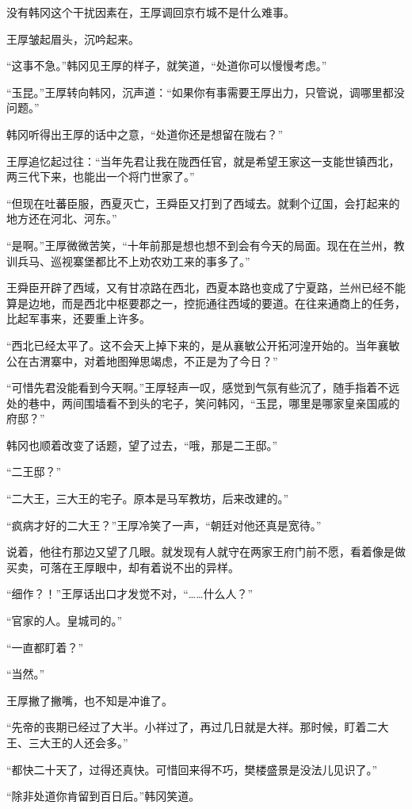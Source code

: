 没有韩冈这个干扰因素在，王厚调回京冇城不是什么难事。

王厚皱起眉头，沉吟起来。

“这事不急。”韩冈见王厚的样子，就笑道，“处道你可以慢慢考虑。”

“玉昆。”王厚转向韩冈，沉声道：“如果你有事需要王厚出力，只管说，调哪里都没问题。”

韩冈听得出王厚的话中之意，“处道你还是想留在陇右？”

王厚追忆起过往：“当年先君让我在陇西任官，就是希望王家这一支能世镇西北，两三代下来，也能出一个将门世家了。”

“但现在吐蕃臣服，西夏灭亡，王舜臣又打到了西域去。就剩个辽国，会打起来的地方还在河北、河东。”

“是啊。”王厚微微苦笑，“十年前那是想也想不到会有今天的局面。现在在兰州，教训兵马、巡视寨堡都比不上劝农劝工来的事多了。”

王舜臣开辟了西域，又有甘凉路在西北，西夏本路也变成了宁夏路，兰州已经不能算是边地，而是西北中枢要郡之一，控扼通往西域的要道。在往来通商上的任务，比起军事来，还要重上许多。

“西北已经太平了。这不会天上掉下来的，是从襄敏公开拓河湟开始的。当年襄敏公在古渭寨中，对着地图殚思竭虑，不正是为了今日？”

“可惜先君没能看到今天啊。”王厚轻声一叹，感觉到气氛有些沉了，随手指着不远处的巷中，两间围墙看不到头的宅子，笑问韩冈，“玉昆，哪里是哪家皇亲国戚的府邸？”

韩冈也顺着改变了话题，望了过去，“哦，那是二王邸。”

“二王邸？”

“二大王，三大王的宅子。原本是马军教坊，后来改建的。”

“疯病才好的二大王？”王厚冷笑了一声，“朝廷对他还真是宽待。”

说着，他往冇那边又望了几眼。就发现有人就守在两家王府门前不愿，看着像是做买卖，可落在王厚眼中，却有着说不出的异样。

“细作？！”王厚话出口才发觉不对，“……什么人？”

“官家的人。皇城司的。”

“一直都盯着？”

“当然。”

王厚撇了撇嘴，也不知是冲谁了。

“先帝的丧期已经过了大半。小祥过了，再过几日就是大祥。那时候，盯着二大王、三大王的人还会多。”

“都快二十天了，过得还真快。可惜回来得不巧，樊楼盛景是没法儿见识了。”

“除非处道你肯留到百日后。”韩冈笑道。

